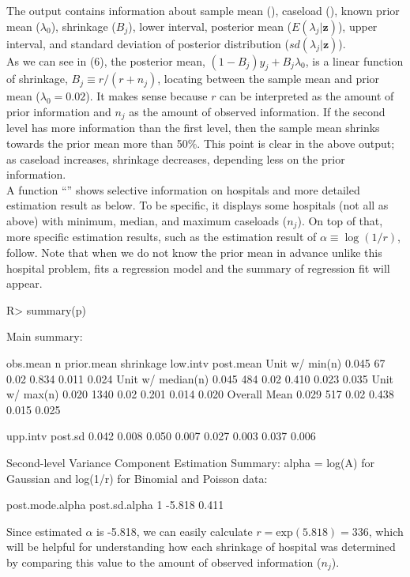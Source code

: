 \documentclass[article]{jss}
\begin{document}
The output contains information about sample mean (), caseload (), known prior mean ($\lambda_{0}$), shrinkage ($B_{j}$), lower interval, posterior mean ($E(\lambda_{j}\vert \textbf{z})$), upper interval, and standard deviation of posterior distribution ($sd(\lambda_{j}\vert \textbf{z})$).
\\

As we can see in (6), the posterior mean, $(1-B_{j})y_{j} + B_{j}\lambda_{0}$, is a linear function of shrinkage, $B_{j}\equiv r / (r + n_{j})$, locating between the sample mean and prior mean ($\lambda_{0}=0.02$). It makes sense because $r$ can be interpreted as the amount of prior information and $n_{j}$ as the amount of observed information. If the second level has more information than the first level, then the sample mean shrinks towards the prior mean more than 50\%. This point is clear in the above output; as caseload increases, shrinkage decreases, depending less on the prior information.
\\

A function ``'' shows selective information on hospitals and more detailed estimation result as below. To be specific, it displays some hospitals (not all as above) with minimum, median, and maximum caseloads ($n_{j}$). On top of that, more specific estimation results, such as the estimation result of $\alpha\equiv\log(1/r)$, follow. Note that when we do not know the prior mean in advance unlike this hospital problem,  fits a regression model and the summary of regression fit will appear.
\begin{CodeChunk}
\begin{CodeInput}
R> summary(p)
\end{CodeInput}
\begin{CodeOutput}
Main summary:

                  obs.mean    n prior.mean shrinkage low.intv post.mean
Unit w/ min(n)       0.045   67       0.02     0.834    0.011     0.024
Unit w/ median(n)    0.045  484       0.02     0.410    0.023     0.035
Unit w/ max(n)       0.020 1340       0.02     0.201    0.014     0.020
Overall Mean         0.029  517       0.02     0.438    0.015     0.025

                  upp.intv post.sd
                     0.042   0.008
                     0.050   0.007
                     0.027   0.003
                     0.037   0.006

Second-level Variance Component Estimation Summary:
alpha = log(A) for Gaussian and log(1/r) for Binomial and Poisson data:

  post.mode.alpha post.sd.alpha
1          -5.818         0.411
\end{CodeOutput}
\end{CodeChunk}
Since estimated $\alpha$ is -5.818, we can easily calculate $r=\textrm{exp}(5.818)=336$, which will be helpful for understanding how each shrinkage of hospital was determined by comparing this value to the amount of observed information ($n_{j}$).
\\
\end{document}
